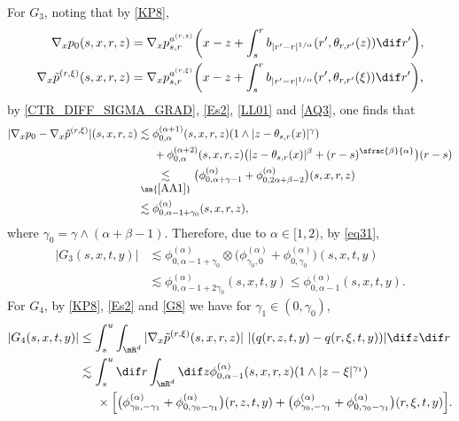 For $G_3$, noting that by \eqref{KP8},
\begin{align*}
\nabla_x {p}_0(s,x,r,z)&=\nabla_x {p}^{a^{(r,z)}}_{s,r}\biggl(x-z+\int^r_s b_{|r'-r|^{1/\alpha}}(r',\theta_{r,r'}(z))\dif r'\biggr),\\
\nabla_x \tilde{p}^{({r},\xi)}(s,x,r,z)&=\nabla_x {p}^{a^{(r,\xi)}}_{s,r}\biggl(x-z+\int^r_s b_{|r'-r|^{1/\alpha}}(r',\theta_{r,r'}(\xi))\dif r'\biggr),
\end{align*}
by \eqref{CTR_DIFF_SIGMA_GRAD}, \eqref{Es2}, \eqref{LL01} and \eqref{AQ3}, one finds that
\begin{align*}%
|\nabla_x {p}_0-\nabla_x \tilde{p}^{(r,\xi)}|(s,x,r,z)
&\lesssim\phi_{0,\alpha}^{(\alpha+1)}(s,x,r,z) (1\wedge |z-\theta_{s,r}(x)|^\gamma)\\
&\hspace*{.5cm}+\phi_{0,\alpha}^{(\alpha+2)}(s,x,r,z)\bigl(|z-\theta_{s,r}(x)|^\beta+(r-s)^{\sfrac{\beta}{\alpha}}\bigr)(r-s)\\
&\underset{\sm{\eqref{AA1}}}{\lesssim}\bigl(\phi_{0,\alpha+\gamma-1}^{(\alpha)}+\phi_{0,2\alpha+\beta-2}^{(\alpha)}\bigr)(s,x,r,z)\\
&\lesssim\phi_{0,\alpha-1+\gamma_0}^{(\alpha)}(s,x,r,z),
\end{align*}
where $\gamma_0=\gamma\wedge(\alpha+\beta-1)$.
Therefore, due to $\alpha\in[1,2)$, by \eqref{eq31},
\begin{equation}
\begin{aligned}\label{CTR_SECOND_SUMMAND}
|G_3(s,x,t,y)|&\lesssim
\phi_{0,\alpha-1+\gamma_0}^{(\alpha)}\otimes
\bigl(\phi_{\gamma_0,0}^{(\alpha)} +\phi_{0,\gamma_0}^{(\alpha)}\bigr)(s,x,t,y)\\
&\lesssim\phi_{0,\alpha-1+2\gamma_0}^{(\alpha)}(s,x,t,y)
\leq\phi_{0,\alpha-1}^{(\alpha)}(s,x,t,y).
\end{aligned}
\end{equation}
For $G_4$, by \eqref{KP8}, \eqref{Es2}
and \eqref{G8} we have for $\gamma_1\in(0,\gamma_0)$,
\begin{align*}
|G_4(s,x,t,y)|
&\le \int_s^u\int_{\mR^d}|\nabla_x\tilde{p}^{(r,\xi)}(s,x,r,z)|\ |(q(r,z,t,y)-q(r,\xi,t,y))|\dif z \dif r\\
&\lesssim \int_s^u\dif r\int_{\mR^d} \dif z \phi_{0,\alpha-1}^{(\alpha)}(s,x,r,z)(1\wedge |z-\xi|^{\gamma_1})\\
&\hspace*{.5cm}\times\Big[\bigl(\phi^{(\alpha)}_{\gamma_0,-\gamma_1}+\phi^{(\alpha)}_{0,\gamma_0-\gamma_1}\bigr)(r,z,t,y)
+\bigl(\phi^{(\alpha)}_{\gamma_0,-\gamma_1}+\phi^{(\alpha)}_{0,\gamma_0-\gamma_1}\bigr)(r,\xi,t,y)\Big].
\end{align*}
